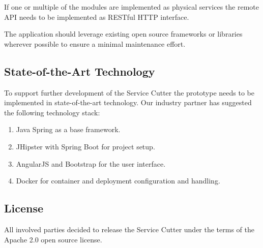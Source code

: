 If one or multiple of the modules are implemented as physical services the remote \gls{API} needs to be implemented as RESTful HTTP interface. 

The application should leverage existing open source frameworks or libraries wherever possible to ensure a minimal maintenance effort.

\subsection{State-of-the-Art Technology}

To support further development of the Service Cutter the prototype needs to be implemented in state-of-the-art technology. Our industry partner has suggested the following technology stack:

\begin{enumerate}
	\item Java Spring\cite{spring} as a base framework. 
	\item JHipster\cite{jhipster} with Spring Boot\cite{springboot} for project setup.
	\item AngularJS\cite{angularjs} and Bootstrap\cite{bootstrap} for the user interface.
	\item Docker\cite{docker} for container and deployment configuration and handling. 
\end{enumerate}

\subsection{License}

All involved parties decided to release the Service Cutter under the terms of the Apache 2.0 open source license.